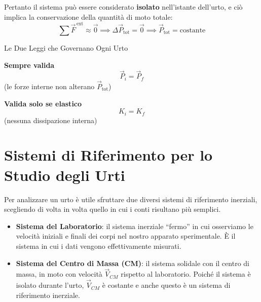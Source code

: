 Pertanto il sistema può essere considerato \textbf{isolato} nell'istante dell'urto, e ciò implica la conservazione della quantità di moto totale:
\begin{equation}
    \sum \vec{F}^{\,\text{ext}} \approx \vec{0}
    \implies \Delta \vec{P}_{\text{tot}} = \vec{0}
    \implies \vec{P}_{\text{tot}} = \text{costante}
\end{equation}

\begin{formulario}{Le Due Leggi che Governano Ogni Urto}
\begin{minipage}[t]{0.47\textwidth}
\centering \textbf{Sempre valida}
\begin{equation*}
    \vec{P}_i = \vec{P}_f
\end{equation*}
\centering \footnotesize (le forze interne non alterano $\vec{P}_{\text{tot}}$)
\end{minipage}
\hfill
\begin{minipage}[t]{0.47\textwidth}
\centering \textbf{Valida solo se elastico}
\begin{equation*}
    K_i = K_f
\end{equation*}
\centering \footnotesize (nessuna dissipazione interna)
\end{minipage}
\vspace{4pt}
\end{formulario}

\section{Sistemi di Riferimento per lo Studio degli Urti}

Per analizzare un urto è utile sfruttare due diversi sistemi di riferimento inerziali, scegliendo di volta in volta quello in cui i conti risultano più semplici.

\begin{itemize}
    \item \textbf{Sistema del Laboratorio}: il sistema inerziale ``fermo'' in cui osserviamo le velocità iniziali e finali dei corpi nel nostro apparato sperimentale. È il sistema in cui i dati vengono effettivamente misurati.
    \item \textbf{Sistema del Centro di Massa (CM)}: il sistema solidale con il centro di massa, in moto con velocità $\vec{V}_{CM}$ rispetto al laboratorio. Poiché il sistema è isolato durante l'urto, $\vec{V}_{CM}$ è costante e anche questo è un sistema di riferimento inerziale.
\end{itemize}

